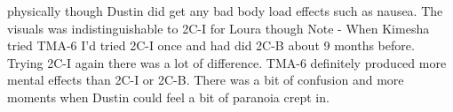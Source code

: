 \documentclass[12pt]{book}
\begin{document}
physically though Dustin did get any bad body load effects such as nausea. The visuals was indistinguishable to 2C-I for Loura though Note - When Kimesha tried TMA-6 I'd tried 2C-I once and had did 2C-B about 9 months before. Trying 2C-I again there was a lot of difference. TMA-6 definitely produced more mental effects than 2C-I or 2C-B. There was a bit of confusion and more moments when Dustin could feel a bit of paranoia crept in.
\end{document}
